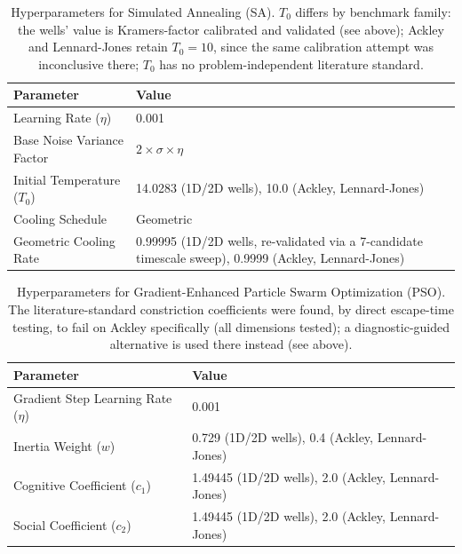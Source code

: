 \documentclass{opt2026} %
\begin{document}
\begin{table}[!htbp]
\centering
\caption{Hyperparameters for Simulated Annealing (SA). $T_0$ differs by benchmark family: the wells' value is Kramers-factor calibrated and validated (see above); Ackley and Lennard-Jones retain $T_0=10$, since the same calibration attempt was inconclusive there; $T_0$ has no problem-independent literature standard.}
\label{tab:sa_hyperparams}
\begin{tabular}{@{}lp{}@{}}
\toprule
\textbf{Parameter} & \textbf{Value} \\
\midrule
Learning Rate ($\eta$) & 0.001 \\
Base Noise Variance Factor & $2 \times \sigma \times \eta$ \\
Initial Temperature ($T_0$) & 14.0283 (1D/2D wells), 10.0 (Ackley, Lennard-Jones) \\
Cooling Schedule & Geometric \\
Geometric Cooling Rate & 0.99995 (1D/2D wells, re-validated via a 7-candidate timescale sweep), 0.9999 (Ackley, Lennard-Jones) \\
\bottomrule
\end{tabular}
\end{table}

\begin{table}[!htbp]
\centering
\caption{Hyperparameters for Gradient-Enhanced Particle Swarm Optimization (PSO). The literature-standard constriction coefficients were found, by direct escape-time testing, to fail on Ackley specifically (all dimensions tested); a diagnostic-guided alternative is used there instead (see above).}
\label{tab:pso_hyperparams}
\begin{tabular}{@{}ll@{}}
\toprule
\textbf{Parameter} & \textbf{Value} \\
\midrule
Gradient Step Learning Rate ($\eta$) & 0.001 \\
Inertia Weight ($w$) & 0.729 (1D/2D wells), 0.4 (Ackley, Lennard-Jones) \\
Cognitive Coefficient ($c_1$) & 1.49445 (1D/2D wells), 2.0 (Ackley, Lennard-Jones) \\
Social Coefficient ($c_2$) & 1.49445 (1D/2D wells), 2.0 (Ackley, Lennard-Jones) \\
\bottomrule
\end{tabular}
\end{table}
\end{document}
